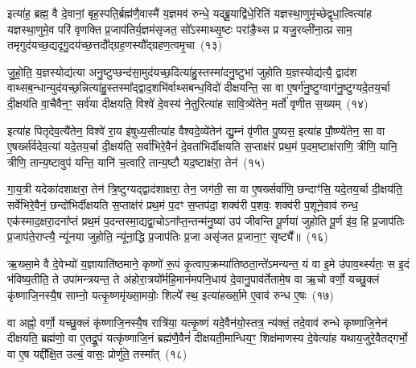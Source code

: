 इत्या॑ह॒ ब्रह्म॒ वै दे॒वानां॒ बृह॒स्पति॒र्ब्रह्म॑णै॒वास्मै॑ य॒ज्ञमव॑ रुन्धे॒ यद्ब्रू॒याद्वि॑धे॒रिति॑ यज्ञस्था॒णुमृ॑च्छेद्वृधा॒त्वित्या॑ह यज्ञस्था॒णुमे॒व परि॑ वृणक्ति प्र॒जा\-प॑तिर्य॒ज्ञम॑सृजत॒ सो᳚\-ऽस्माथ्सृ॒ष्टः परा॑ङै॒थ्स प्र यजु॒रव्ली॑ना॒त्प्र साम॒ तमृगुद॑यच्छ॒द्यदृगु॒दय॑च्छ॒त्तदौ᳚द्ग्रह॒णस्यौ᳚द्ग्रहण॒त्वमृ॒चा~(१३)

जु॒हो॒ति॒ य॒ज्ञस्योद्य॑त्या अनु॒ष्टुप्छन्द॑सा॒मुद॑यच्छ॒दित्या॑हु॒स्तस्मा॑दनु॒ष्टुभा॑ जुहोति य॒ज्ञस्योद्य॑त्यै॒ द्वाद॑श वाथ्सब॒न्धान्युद॑यच्छ॒न्नित्या॑हु॒स्तस्मा᳚द्द्वाद॒शभि॑र्वाथ्सबन्ध॒विदो॑ दीक्षयन्ति॒ सा वा ए॒षर्ग॑नु॒ष्टुग्वाग॑नु॒ष्टुग्यदे॒तय॒र्चा दी॒क्षय॑ति वा॒चैवैन॒ꣳ॒ सर्व॑या दीक्षयति॒ विश्वे॑ दे॒वस्य॑ ने॒तुरित्या॑ह सावि॒त्र्ये॑तेन॒ मर्तो॑ वृणीत स॒ख्यम्~(१४)

इत्या॑ह पितृदेव॒त्यै॑तेन॒ विश्वे॑ रा॒य इ॑षुध्य॒सीत्या॑ह वैश्वदे॒व्ये॑तेन॑ द्यु॒म्नं वृ॑णीत पु॒ष्यस॒ इत्या॑ह पौ॒ष्ण्ये॑तेन॒ सा वा ए॒षर्ख्स॑र्वदेव॒त्या॑ यदे॒तय॒र्चा दी॒क्षय॑ति॒ सर्वा॑भिरे॒वैनं॑ दे॒वता॑भिर्दीक्षयति स॒प्ताक्ष॑रं प्रथ॒मं प॒दम॒ष्टाक्ष॑राणि॒ त्रीणि॒ यानि॒ त्रीणि॒ तान्य॒ष्टावुप॑ यन्ति॒ यानि॑ च॒त्वारि॒ तान्य॒ष्टौ यद॒ष्टाक्ष॑रा॒ तेन॑~(१५)

गा॒य॒त्री यदेका॑\-दशाक्षरा॒ तेन॑ त्रि॒ष्टुग्यद्द्वाद॑शाक्षरा॒ तेन॒ जग॑ती॒ सा वा ए॒षर्ख्सर्वा॑णि॒ छन्दाꣳ॑सि॒ यदे॒तय॒र्चा दी॒क्षय॑ति॒ सर्वे॑भिरे॒वैनं॒ छन्दो॑भिर्दीक्षयति स॒प्ताक्ष॑रं प्रथ॒मं प॒दꣳ स॒प्तप॑दा॒ शक्व॑री प॒शवः॒ शक्व॑री प॒शूने॒वाव॑ रुन्ध॒ एक॑स्माद॒क्षरा॒दना᳚प्तं प्रथ॒मं प॒दन्तस्मा॒द्यद्वा॒चो\-ऽना᳚प्त॒न्तन्म॑नु॒ष्या॑ उप॑ जीवन्ति पू॒र्णया॑ जुहोति पू॒र्ण इ॑व॒ हि प्र॒जा\-प॑तिः प्र॒जा\-प॑ते॒राप्त्यै॒ न्यू॑नया जुहोति॒ न्यू॑ना॒द्धि प्र॒जा\-प॑तिः प्र॒जा असृ॑जत प्र॒जाना॒ꣳ॒ सृष्ट्यै᳚॥~(१६)

{\anuvakamend[{अ॒ग्नये॒ ता वृ॑धात्वृ॒चा स॒ख्यन्तेन॑ जुहोति॒ पञ्च॑दश च}]}%

ऋ॒ख्सा॒मे वै दे॒वेभ्यो॑ य॒ज्ञायाति॑ष्ठमाने॒ कृष्णो॑ रू॒पं कृ॒त्वाप॒क्रम्या॑तिष्ठता॒न्ते॑\-ऽमन्यन्त॒ यं वा इ॒मे उ॑पाव॒र्थ्स्यतः॒ स इ॒दं भ॑विष्य॒तीति॒ ते उपा॑मन्त्रयन्त॒ ते अ॑होरा॒त्रयो᳚र्महि॒मान॑मपनि॒धाय॑ दे॒वानु॒पाव॑र्तेतामे॒ष वा ऋ॒चो वर्णो॒ यच्छु॒क्लं कृ॑ष्णाजि॒नस्यै॒ष साम्नो॒ यत्कृ॒ष्णमृ॑ख्सा॒मयोः॒ शिल्पे᳚ स्थ॒ इत्या॑हर्ख्सा॒मे ए॒वाव॑ रुन्ध ए॒षः~(१७)

वा अह्नो॒ वर्णो॒ यच्छु॒क्लं कृ॑ष्णाजि॒नस्यै॒ष रात्रि॑या॒ यत्कृ॒ष्णं यदे॒वैन॑यो॒स्तत्र॒ न्य॑क्तं॒ तदे॒वाव॑ रुन्धे कृष्णाजि॒नेन॑ दीक्षयति॒ ब्रह्म॑णो॒ वा ए॒तद्रू॒पं यत्कृ॑ष्णाजि॒नं ब्रह्म॑णै॒वैनं॑ दीक्षयती॒मान्धिय॒ꣳ॒ शिक्ष॑माणस्य दे॒वेत्या॑ह यथाय॒जुरे॒वैतद्गर्भो॒ वा ए॒ष यद्दी᳚क्षि॒त उल्बं॒ वासः॒ प्रोर्णु॑ते॒ तस्मा᳚त्~(१८)

